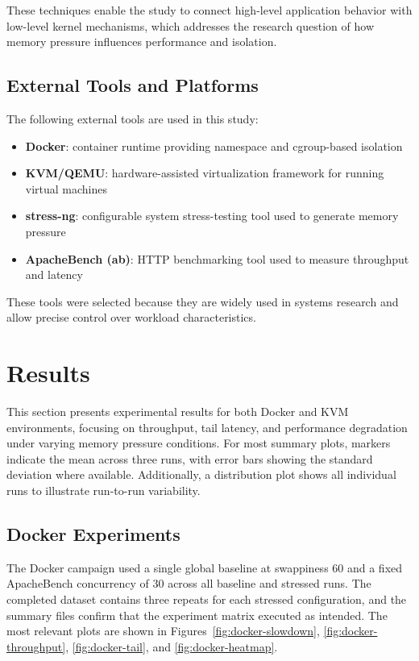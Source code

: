 \documentclass[conference]{IEEEtran}
\begin{document}
These techniques enable the study to connect high-level application behavior with low-level kernel mechanisms, which addresses the research question of how memory pressure influences performance and isolation.

\subsection{External Tools and Platforms}

The following external tools are used in this study:

\begin{itemize}
\item \textbf{Docker}: container runtime providing namespace and cgroup-based isolation
\item \textbf{KVM/QEMU}: hardware-assisted virtualization framework for running virtual machines
\item \textbf{stress-ng}: configurable system stress-testing tool used to generate memory pressure \cite{stressng}
\item \textbf{ApacheBench (ab)}: HTTP benchmarking tool used to measure throughput and latency
\end{itemize}

These tools were selected because they are widely used in systems research and allow precise control over workload characteristics.
\section{Results}

This section presents experimental results for both Docker and KVM environments, focusing on throughput, tail latency, and performance degradation under varying memory pressure conditions. For most summary plots, markers indicate the mean across three runs, with error bars showing the standard deviation where available. Additionally, a distribution plot shows all individual runs to illustrate run-to-run variability.

\subsection{Docker Experiments}

The Docker campaign used a single global baseline at swappiness 60 and a fixed ApacheBench concurrency of 30 across all baseline and stressed runs. The completed dataset contains three repeats for each stressed configuration, and the summary files confirm that the experiment matrix executed as intended. The most relevant plots are shown in Figures~\ref{fig:docker-slowdown}, \ref{fig:docker-throughput}, \ref{fig:docker-tail}, and \ref{fig:docker-heatmap}.
\end{document}
